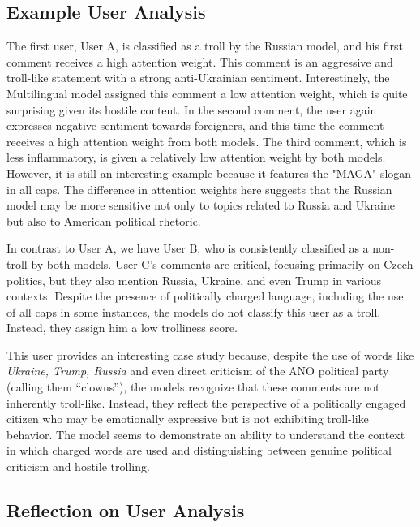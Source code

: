\documentclass[twoside]{ctuthesis}
\theoremstyle{plain}
\theoremstyle{definition}
\theoremstyle{note}
\begin{document}
\subsection{Example User Analysis}

The first user, User A, is classified as a troll by the Russian model, and his first comment receives a high attention weight. This comment is an aggressive and troll-like statement with a strong anti-Ukrainian sentiment.  Interestingly, the Multilingual model assigned this comment a low attention weight, which is quite surprising given its hostile content. In the second comment, the user again expresses negative sentiment towards foreigners, and this time the comment receives a high attention weight from both models. The third comment, which is less inflammatory, is given a relatively low attention weight by both models. However, it is still an interesting example because it features the "MAGA" slogan in all caps. The difference in attention weights here suggests that the Russian model may be more sensitive not only to topics related to Russia and Ukraine but also to American political rhetoric.\par

In contrast to User A, we have User B, who is consistently classified as a non-troll by both models. User C's comments are critical, focusing primarily on Czech politics, but they also mention Russia, Ukraine, and even Trump in various contexts. Despite the presence of politically charged language, including the use of all caps in some instances, the models do not classify this user as a troll. Instead, they assign him a low trolliness score.\par

This user provides an interesting case study because, despite the use of words like \textit{Ukraine, Trump, Russia} and even direct criticism of the ANO political party (calling them ``clowns''), the models recognize that these comments are not inherently troll-like. Instead, they reflect the perspective of a politically engaged citizen who may be emotionally expressive but is not exhibiting troll-like behavior. The model seems to demonstrate an ability to understand the context in which charged words are used and distinguishing between genuine political criticism and hostile trolling.\par

\subsection{Reflection on User Analysis}
\end{document}
